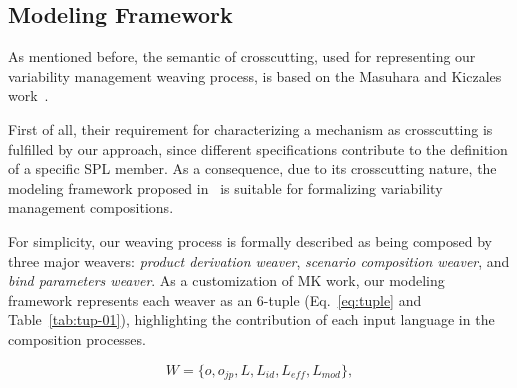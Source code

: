 %




\subsection{Modeling Framework}\label{sub:modeling-framework}

As mentioned before, the semantic of crosscutting, used for representing our variability management weaving process, is based on the Masuhara and Kiczales work~\cite{kiczales-ecoop-2003}.

First of all, their requirement for characterizing a mechanism as crosscutting is fulfilled by our approach, since different specifications contribute to the definition of a specific SPL member. As a consequence, due to its crosscutting nature, the modeling framework proposed in~\cite{kiczales-ecoop-2003}  is suitable for formalizing variability management compositions.

For simplicity, our weaving process is formally described as being composed by three major weavers: \emph{product derivation weaver}, \emph{scenario composition weaver}, and \emph{bind parameters weaver}. As a customization of MK work, our modeling framework represents each weaver as an 6-tuple (Eq.~\ref{eq:tuple} and Table~\ref{tab:tup-01}), highlighting the contribution of each input language in the composition processes.

\begin{equation}
W = \{o, o_{jp}, L, L_{id}, L_{eff}, L_{mod}\},
\label{eq:tuple}
\end{equation}

